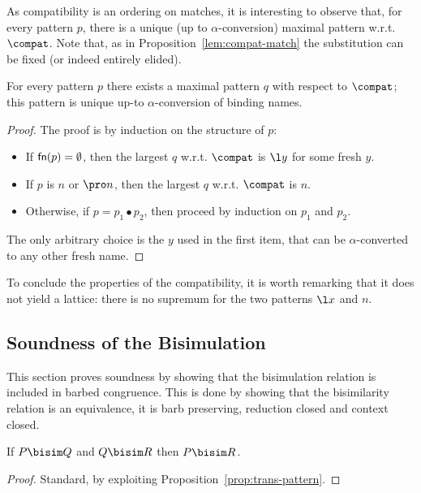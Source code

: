 \documentclass{LMCS}
\begin{document}
\noindent As compatibility is an ordering on matches,
it is interesting to observe that, for every pattern $p$, there is a unique (up to $\alpha$-conversion) 
maximal pattern w.r.t. $\compat$. Note that, as in Proposition~\ref{lem:compat-match} the substitution can be 
fixed (or indeed entirely elided).

\begin{prop}
\label{prop:maximal}
For every pattern $p$ there exists a maximal pattern $q$ with respect to $\compat$;
this pattern is unique up-to $\alpha$-conversion of binding names.
\end{prop}
\begin{proof}
The proof is by induction on the structure of $p$:
\begin{itemize}
	\item If ${\sf fn}(p)=\emptyset$, then the largest $q$ w.r.t. $\compat$ is $\l y$ for some fresh $y$.
	\item If $p$ is $n$ or $\pro n$, then the largest $q$ w.r.t. $\compat$ is $n$.
	\item Otherwise, if $p=p_1\bullet p_2$, then proceed by induction on $p_1$ and $p_2$.
\end{itemize}
The only arbitrary choice is the $y$ used in the first item, that can be $\alpha$-converted to
any other fresh name.
\end{proof}

To conclude the properties of the compatibility, it is worth remarking that it does not yield a lattice: there is no supremum for the two patterns $\l x$ and $n$.



\subsection{Soundness of the Bisimulation}
\label{sec:sound}

This section proves soundness by showing that the bisimulation relation is included in barbed congruence.
This is done by showing that the bisimilarity relation is an equivalence, it is
barb preserving, reduction closed and context closed.

\begin{lem}
\label{lem:trans-bisim}
If $P\bisim Q$ and $Q\bisim R$ then $P\bisim R$.
\end{lem}
\begin{proof}
Standard, by exploiting Proposition~\ref{prop:trans-pattern}.
\end{proof}
\end{document}
